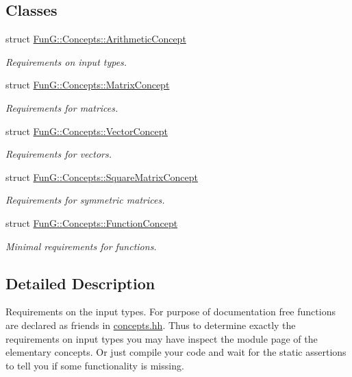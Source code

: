 \subsection*{Classes}
\begin{DoxyCompactItemize}
\item 
struct \hyperlink{structFunG_1_1Concepts_1_1ArithmeticConcept}{Fun\-G\-::\-Concepts\-::\-Arithmetic\-Concept}
\begin{DoxyCompactList}\small\item\em Requirements on input types. \end{DoxyCompactList}\item 
struct \hyperlink{structFunG_1_1Concepts_1_1MatrixConcept}{Fun\-G\-::\-Concepts\-::\-Matrix\-Concept}
\begin{DoxyCompactList}\small\item\em Requirements for matrices. \end{DoxyCompactList}\item 
struct \hyperlink{structFunG_1_1Concepts_1_1VectorConcept}{Fun\-G\-::\-Concepts\-::\-Vector\-Concept}
\begin{DoxyCompactList}\small\item\em Requirements for vectors. \end{DoxyCompactList}\item 
struct \hyperlink{structFunG_1_1Concepts_1_1SquareMatrixConcept}{Fun\-G\-::\-Concepts\-::\-Square\-Matrix\-Concept}
\begin{DoxyCompactList}\small\item\em Requirements for symmetric matrices. \end{DoxyCompactList}\item 
struct \hyperlink{structFunG_1_1Concepts_1_1FunctionConcept}{Fun\-G\-::\-Concepts\-::\-Function\-Concept}
\begin{DoxyCompactList}\small\item\em Minimal requirements for functions. \end{DoxyCompactList}\end{DoxyCompactItemize}


\subsection{Detailed Description}
Requirements on the input types. For purpose of documentation free functions are declared as friends in \hyperlink{concepts_8hh}{concepts.\-hh}. Thus to determine exactly the requirements on input types you may have inspect the module page of the elementary concepts. Or just compile your code and wait for the static assertions to tell you if some functionality is missing. 